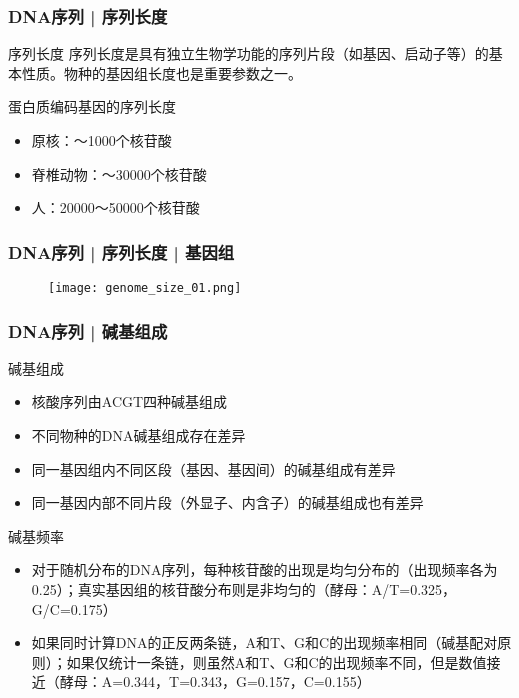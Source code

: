 \begin{frame}
  \frametitle{DNA序列 | 序列长度}
  \begin{block}{序列长度}
    序列长度是具有独立生物学功能的序列片段（如基因、启动子等）的基本性质。物种的基因组长度也是重要参数之一。 
  \end{block}
  \pause
  \begin{block}{蛋白质编码基因的序列长度}
    \begin{itemize}
      \item 原核：～1000个核苷酸
      \item 脊椎动物：～30000个核苷酸
      \item 人：20000～50000个核苷酸
    \end{itemize}
  \end{block}
\end{frame}

\begin{frame}
  \frametitle{DNA序列 | 序列长度 | 基因组}
  \begin{figure}
    \centering
    \texttt{[image: genome\_size\_01.png]}
  \end{figure}
\end{frame}

\begin{frame}
  \frametitle{DNA序列 | 碱基组成}
  \begin{block}{碱基组成}
  \begin{itemize}
    \item 核酸序列由ACGT四种碱基组成
    \item 不同物种的DNA碱基组成存在差异
    \item 同一基因组内不同区段（基因、基因间）的碱基组成有差异
    \item 同一基因内部不同片段（外显子、内含子）的碱基组成也有差异
  \end{itemize}
  \end{block}
  \vspace{-0.3em}
  \pause
  \begin{block}{碱基频率}
  \begin{itemize}
    \item 对于随机分布的DNA序列，每种核苷酸的出现是均匀分布的（出现频率各为0.25）；真实基因组的核苷酸分布则是非均匀的（酵母：A/T=0.325，G/C=0.175）
    \item 如果同时计算DNA的正反两条链，A和T、G和C的出现频率相同（碱基配对原则）；如果仅统计一条链，则虽然A和T、G和C的出现频率不同，但是数值接近（酵母：A=0.344，T=0.343，G=0.157，C=0.155）
  \end{itemize}
  \end{block}
\end{frame}

